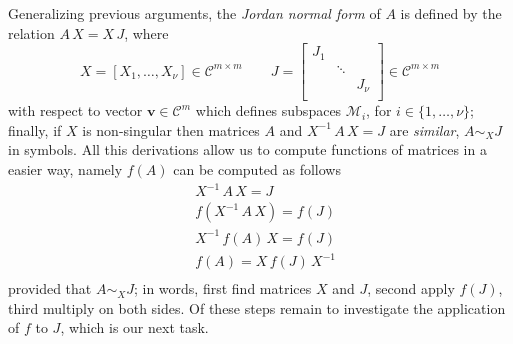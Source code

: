Generalizing previous arguments, the \textit{Jordan normal form} of $A$ is
defined by the relation $A\,X = X\, J$, where
\begin{displaymath}
X = \left[X_{1},\ldots,X_{\nu} \right]\in\mathcal{C}^{m\times m} \quad\quad
J = \left[ \begin{array}{ccc}
    J_{1} \\
      & \ddots \\
      & & J_{\nu} \\
\end{array} \right] \in\mathcal{C}^{m\times m}
\end{displaymath}
with respect to vector $\boldsymbol{v}\in\mathcal{C}^{m}$ which defines
subspaces $\mathcal{M}_{i}$, for $i\in \lbrace 1,\ldots,\nu \rbrace$; finally,
if $X$ is non-singular then matrices $A$ and $X^{-1}\,A\,X = J$ are
    \textit{similar}, $A \sim_{X} J$ in symbols. All this derivations allow us
    to compute functions of matrices in a easier way, namely $f(A)$ can be
    computed as follows
\begin{displaymath}
\begin{split}
&X^{-1}\,A\,X = J\\
&f(X^{-1}\,A\,X) = f(J)\\
&X^{-1}\,f(A)\,X = f(J)\\
&f(A) = X\,f(J)\,X^{-1}\\
\end{split}
\end{displaymath}
provided that $A \sim_{X} J$; in words, first find matrices $X$ and $J$, second
apply $f(J)$, third multiply on both sides. Of these steps remain to
investigate the application of $f$ to $J$, which is our next task.




